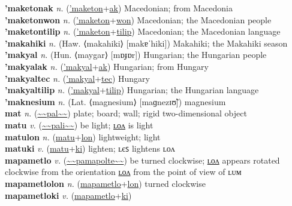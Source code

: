 \textbf{'maketonak} \textit{n.} (\hyperref['maketon]{'maketon}+\hyperref[ak]{ak})
Macedonian; from Macedonia \label{'maketonak} \\
\textbf{'maketonwon} \textit{n.} (\hyperref['maketon]{'maketon}+\hyperref[won]{won})
Macedonian; the Macedonian people \label{'maketonwon} \\
\textbf{'maketontilip} \textit{n.} (\hyperref['maketon]{'maketon}+\hyperref[tilip]{tilip})
Macedonian; the Macedonian language \label{'maketontilip} \\
\textbf{'makahiki} \textit{n.} (Haw. ⟨makahiki⟩ [makɐˈhiki])
Makahiki; the Makahiki season \label{'makahiki} \\
\textbf{'makyal} \textit{n.} (Hun. ⟨maygar⟩ [mɒɟɒr])
Hungarian; the Hungarian people \label{'makyal} \\
\textbf{'makyalak} \textit{n.} (\hyperref['makyal]{'makyal}+\hyperref[ak]{ak})
Hungarian; from Hungary \label{'makyalak} \\
\textbf{'makyaltec} \textit{n.} (\hyperref['makyal]{'makyal}+\hyperref[tec]{tec})
Hungary \label{'makyaltec} \\
\textbf{'makyaltilip} \textit{n.} (\hyperref['makyal]{'makyal}+\hyperref[tilip]{tilip})
Hungarian; the Hungarian language \label{'makyaltilip} \\
\textbf{'maknesium} \textit{n.} (Lat. ⟨magnesium⟩ [maɡnezɪʊ̃])
magnesium \label{'maknesium} \\
\textbf{mat} \textit{n.} (\hyperref[pal]{\~{}\~{}pal\~{}\~{}})
plate; board; wall; rigid two-dimensional object \label{mat} \\
\textbf{matu} \textit{v.} (\hyperref[pali]{\~{}\~{}pali\~{}\~{}})
be light; \hyperref[matulon]{ʟᴏᴧ} is light \label{matu} \\
\textbf{matulon} \textit{n.} (\hyperref[matu]{matu}+\hyperref[lon]{lon})
lightweight; light \label{matulon} \\
\textbf{matuki} \textit{v.} (\hyperref[matu]{matu}+\hyperref[ki]{ki})
lighten; ʟєꜱ lightens ʟᴏᴧ \label{matuki} \\
\textbf{mapametlo} \textit{v.} (\hyperref[pamapolte]{\~{}\~{}pamapolte\~{}\~{}})
be turned clockwise; \hyperref[mapametlolon]{ʟᴏᴧ} appears rotated clockwise from the orientation \hyperref[mapametlolon]{ʟᴏᴧ} from the point of view of ʟᴜᴍ \label{mapametlo} \\
\textbf{mapametlolon} \textit{n.} (\hyperref[mapametlo]{mapametlo}+\hyperref[lon]{lon})
turned clockwise \label{mapametlolon} \\
\textbf{mapametloki} \textit{v.} (\hyperref[mapametlo]{mapametlo}+\hyperref[ki]{ki})
